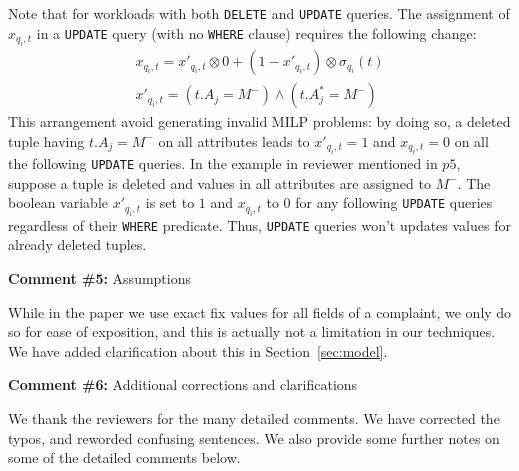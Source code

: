 Note that for workloads with both \texttt{DELETE} and \texttt{UPDATE} queries.
The assignment of $x_{q_i, t}$ in a \texttt{UPDATE} query 
(with no \texttt{WHERE} clause) requires the following change:
\begin{align}
\label{eq:x2}
x_{q_i, t} = x'_{q_i, t} \otimes 0 + (1-x'_{q_i, t}) \otimes \sigma_{q_i}(t) \nonumber \\
x'_{q_i, t}= (t.A_j = M^-) \wedge (t.A_j^* = M^-) 
\end{align}
This arrangement avoid generating invalid MILP problems:
by doing so, a deleted tuple having $t.A_j = M^-$ on all attributes leads to 
$x'_{q_i, t} = 1$ and $x_{q_i, t}  = 0$ on all the following \texttt{UPDATE} queries. 
In the example in reviewer mentioned in $p5$, suppose a tuple is deleted and values in all attributes are assigned to $M^-$. 
The boolean variable $x'_{q_i, t}$ is set to $1$ and $x_{q_i, t} $ to $0$ for any following \texttt{UPDATE} queries regardless
of their \texttt{WHERE} predicate. Thus, \texttt{UPDATE} queries won't updates values for already deleted tuples. 

\comskip

\noindent
\textbf{Comment \#5:} Assumptions
\begin{quote}
\end{quote}

While in the paper we use exact fix values for all fields of a complaint, we
only do so for ease of exposition, and this is actually not a limitation in
our techniques. We have added clarification about this in
Section~\ref{sec:model}.



\comskip

\noindent
\textbf{Comment \#6:} Additional corrections and clarifications

\smallskip

We thank the reviewers for the many detailed comments. We have corrected the
typos, and reworded confusing sentences. We also provide some further notes on
some of the detailed comments below.

\begin{quote}
\end{quote}

